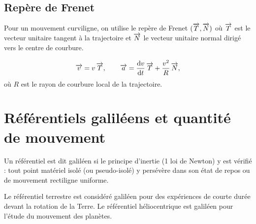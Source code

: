 \subsection{Repère de Frenet}

Pour un mouvement curviligne, on utilise le repère de Frenet $(\overrightarrow{T},\overrightarrow{N})$ où $\overrightarrow{T}$ est le vecteur unitaire tangent à la trajectoire et $\overrightarrow{N}$ le vecteur unitaire normal dirigé vers le centre de courbure.

\begin{propriete}
\[
\overrightarrow{v} = v\,\overrightarrow{T}, \qquad
\overrightarrow{a} = \dfrac{\mathrm{d}v}{\mathrm{d}t}\,\overrightarrow{T} + \frac{v^{2}}{R}\,\overrightarrow{N},
\]
où $R$ est le rayon de courbure local de la trajectoire.
\end{propriete}

\begin{illus}
\end{illus}

\section{Référentiels galiléens et quantité de mouvement}

\begin{definition}
Un référentiel est dit galiléen si le principe d’inertie (1\iere{} loi de Newton) y est vérifié : tout point matériel isolé (ou pseudo-isolé) y persévère dans son état de repos ou de mouvement rectiligne uniforme.
\end{definition}

\begin{exemple}
Le référentiel terrestre est considéré galiléen pour des expériences de courte durée devant la rotation de la Terre. Le référentiel héliocentrique est galiléen pour l’étude du mouvement des planètes.
\end{exemple}

